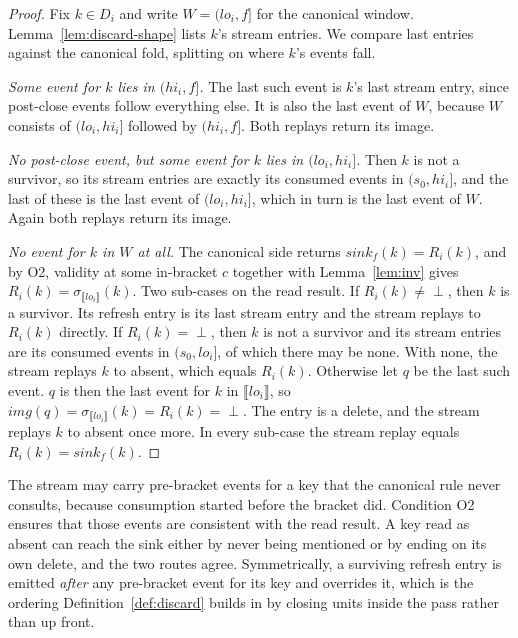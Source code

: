 \documentclass[sigconf,nonacm,10pt]{acmart}
\theoremstyle{plain}
\theoremstyle{definition}
\newcommand{\den}[1]{\llbracket #1 \rrbracket}   %
\newcommand{\window}[2]{(#1,#2]}                 %
\newcommand{\imgof}{\mathit{img}}                %
\newcommand{\sink}{\mathit{sink}}                %
\begin{document}
\begin{proof}
Fix $k \in D_i$ and write $W = \window{lo_i}{f}$ for the canonical
window. Lemma~\ref{lem:discard-shape} lists $k$'s stream entries.
We compare last entries against the canonical fold, splitting on
where $k$'s events fall.

\emph{Some event for $k$ lies in $\window{hi_i}{f}$.} The last
such event is $k$'s last stream entry, since post-close events
follow everything else. It is also the last event of $W$, because
$W$ consists of $\window{lo_i}{hi_i}$ followed by
$\window{hi_i}{f}$. Both replays return its image.

\emph{No post-close event, but some event for $k$ lies in
$\window{lo_i}{hi_i}$.} Then $k$ is not a survivor, so its stream
entries are exactly its consumed events in $\window{s_0}{hi_i}$,
and the last of these is the last event of
$\window{lo_i}{hi_i}$, which in turn is the last event of $W$.
Again both replays return its image.

\emph{No event for $k$ in $W$ at all.} The canonical side returns
$\sink_f(k) = R_i(k)$, and by O2, validity at some in-bracket $c$
together with Lemma~\ref{lem:inv} gives
$R_i(k) = \sigma_{\den{lo_i}}(k)$. Two sub-cases on the read result.
If $R_i(k) \neq \perp$, then $k$ is a survivor. Its refresh entry
is its last stream entry and the stream replays to $R_i(k)$
directly. If $R_i(k) = \perp$, then $k$ is not a survivor and its
stream entries are its consumed events in $\window{s_0}{lo_i}$, of
which there may be none. With none, the stream replays $k$ to
absent, which equals $R_i(k)$. Otherwise let $q$ be the last such
event. $q$ is then the last event for $k$ in $\den{lo_i}$, so
$\imgof(q) = \sigma_{\den{lo_i}}(k) = R_i(k) = \perp$. The entry
is a delete, and the stream replays $k$ to absent once more. In
every sub-case the stream replay equals $R_i(k) = \sink_f(k)$.
\end{proof}

The stream may carry pre-bracket events for a key that the canonical
rule never consults, because consumption started before the bracket did. 
Condition O2 ensures that those events are consistent with the read result.
A key read as absent can reach the sink either by never being 
mentioned or by ending on its own delete, and the two routes agree. 
Symmetrically, a surviving refresh entry
is emitted \emph{after} any pre-bracket event for its key and
overrides it, which is the ordering
Definition~\ref{def:discard} builds in by closing units inside the
pass rather than up front.
\end{document}
